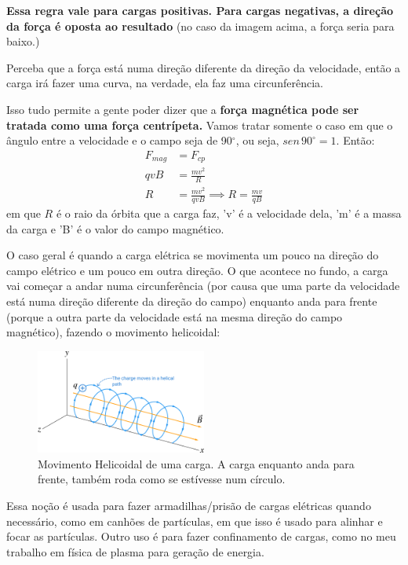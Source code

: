 \documentclass[12pt]{extarticle}
\newcommand{\<}{\langle}
\renewcommand{\>}{\rangle}
\theoremstyle{definition}
\begin{document}
\textbf{Essa regra vale para cargas positivas. Para cargas negativas, a direção da força é oposta ao resultado} (no caso da imagem acima, a força seria para baixo.)

Perceba que a força está numa direção diferente da direção da velocidade, então a carga irá fazer uma curva, na verdade, ela faz uma circunferência. 

Isso tudo permite a gente poder dizer que a \textbf{força magnética pode ser tratada como uma força centrípeta.} Vamos tratar somente o caso em que o ângulo entre a velocidade e o campo seja de 90$^\circ$, ou seja, $sen\,90^\circ =1$. Então:
\begin{equation}
    \begin{split}
        F_{mag} &= F_{cp}\\
        qvB &= \frac{mv^2}{R}\\
        R &= \frac{mv^2}{qvB} \implies \boxed{R = \frac{mv}{qB}}
    \end{split}
\end{equation}
\noindent em que $R$ é o raio da órbita que a carga faz, 'v' é a velocidade dela, 'm' é a massa da carga e 'B' é o valor do campo magnético.

O caso geral é quando a carga elétrica se movimenta um pouco na direção do campo elétrico e um pouco em outra direção. O que acontece no fundo, a carga vai começar a andar numa circunferência (por causa que uma parte da velocidade está numa direção diferente da direção do campo) enquanto anda para frente (porque a outra parte da velocidade está na mesma direção do campo magnético), fazendo o movimento helicoidal:
\begin{figure}[H]
    \centering
    \includegraphics[width=0.5\textwidth]{charge-on-helix.png}
    \caption{Movimento Helicoidal de uma carga. A carga enquanto anda para frente, também roda como se estívesse num círculo.}
    \label{fig:my_label}
\end{figure}

Essa noção é usada para fazer armadilhas/prisão de cargas elétricas quando necessário, como em canhões de partículas, em que isso é usado para alinhar e focar as partículas. Outro uso é para fazer confinamento de cargas, como no meu trabalho em física de plasma para geração de energia.
\end{document}
